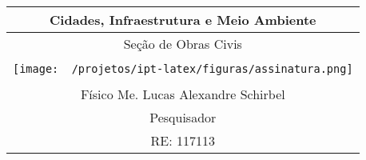 \begin{table}[b]
  \begin{adjustwidth}{0pt}{-9cm} %
  \centering
  \setlength{\arrayrulewidth}{0.9pt} %
  \begin{tabular}{|c|}
    \hline
    Cidades, Infraestrutura e Meio Ambiente \\
    \hline
    Seção de Obras Civis \\
    \hline \\[1.0pt]
    \texttt{[image: ~/projetos/ipt-latex/figuras/assinatura.png]} \\[5.0pt]
    \hline \\[-25.0pt]
    Físico Me. Lucas Alexandre Schirbel \\[-7.0pt]
    Pesquisador \\[-7.0pt]
    RE: 117113 \\[0.0pt]
    \hline
  \end{tabular}
  \end{adjustwidth}
\end{table}
